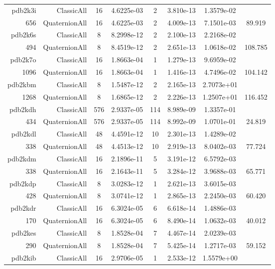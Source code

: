 \begin{xltabular}{\textwidth}{r|rcS[table-format=1.4e+2]cS[table-format=1.3e+2]S[table-format=1.4e+2]S[table-format=-1.3]}
pdb2k3i & ClassicAll & 16 & 4.6225e-03 & 2 & 3.810e-13 & 1.3579e-02 & \\
656 & QuaternionAll & 16 & 4.6225e-03 & 2 & 4.009e-13 & 7.1501e-03 & 89.919\\  \addlinespace
pdb2k6s & ClassicAll & 8 & 8.2998e-12 & 2 & 2.100e-13 & 2.2168e-02 & \\
494 & QuaternionAll & 8 & 8.4519e-12 & 2 & 2.651e-13 & 1.0618e-02 & 108.785\\  \addlinespace
pdb2k7o & ClassicAll & 16 & 1.8663e-04 & 1 & 1.279e-13 & 9.6959e-02 & \\
1096 & QuaternionAll & 16 & 1.8663e-04 & 1 & 1.416e-13 & 4.7496e-02 & 104.142\\  \addlinespace
pdb2kbm & ClassicAll & 8 & 1.5487e-12 & 2 & 2.165e-13 & 2.7073e+01 & \\
1268 & QuaternionAll & 8 & 1.6865e-12 & 2 & 2.226e-13 & 1.2507e+01 & 116.452\\  \addlinespace
pdb2kdh & ClassicAll & 576 & 2.9337e-05 & 114 & 8.989e-09 & 1.3357e-01 & \\
434 & QuaternionAll & 576 & 2.9337e-05 & 114 & 8.992e-09 & 1.0701e-01 & 24.819\\  \addlinespace
pdb2kdl & ClassicAll & 48 & 4.4591e-12 & 10 & 2.301e-13 & 1.4289e-02 & \\
338 & QuaternionAll & 48 & 4.4513e-12 & 10 & 2.919e-13 & 8.0402e-03 & 77.724\\  \addlinespace
pdb2kdm & ClassicAll & 16 & 2.1896e-11 & 5 & 3.191e-12 & 6.5792e-03 & \\
338 & QuaternionAll & 16 & 2.1643e-11 & 5 & 3.284e-12 & 3.9688e-03 & 65.771\\  \addlinespace
pdb2kdp & ClassicAll & 8 & 3.0283e-12 & 1 & 2.621e-13 & 3.6015e-03 & \\
428 & QuaternionAll & 8 & 3.0741e-12 & 1 & 2.865e-13 & 2.2450e-03 & 60.420\\  \addlinespace
pdb2kdr & ClassicAll & 16 & 6.3024e-05 & 6 & 6.618e-14 & 1.4886e-03 & \\
170 & QuaternionAll & 16 & 6.3024e-05 & 6 & 8.490e-14 & 1.0632e-03 & 40.012\\  \addlinespace
pdb2kes & ClassicAll & 8 & 1.8528e-04 & 7 & 4.467e-14 & 2.0239e-03 & \\
290 & QuaternionAll & 8 & 1.8528e-04 & 7 & 5.425e-14 & 1.2717e-03 & 59.152\\  \addlinespace
pdb2kib & ClassicAll & 16 & 2.9706e-05 & 1 & 2.533e-12 & 1.5579e+00 & \\

\end{xltabular}
